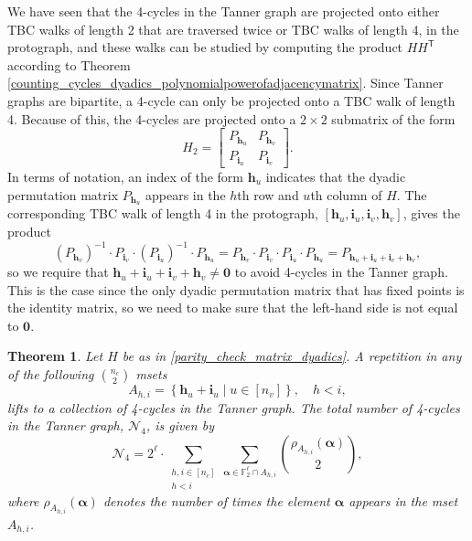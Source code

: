 \documentclass[11pt]{article}
\newtheorem{theorem}[lemma]{Theorem}
\theoremstyle{plain}
\theoremstyle{plain}
\theoremstyle{definition}
\numberwithin{theo}{section}
\newcommand{\bzero}{\mathbf{0}}
\newcommand{\bh}{{\mathbf h}}
\newcommand{\bi}{{\mathbf i}}
\newcommand{\balpha}{{\boldsymbol \alpha}}
\def\matrix#1{\begin{bmatrix}#1\end{bmatrix}} %
\newcounter{alp}
\begin{document}
We have seen that the 4-cycles in the Tanner graph are projected onto either TBC walks of length 2 that are traversed twice or TBC walks of length 4, in the protograph, and these walks can be studied by computing the product $HH^\mathsf{T}$ according to Theorem \ref{counting_cycles_dyadics_polynomialpowerofadjacencymatrix}. Since Tanner graphs are bipartite, a 4-cycle can only be projected onto a TBC walk of length 4. Because of this, the 4-cycles are projected onto a $2\times2$ submatrix of the form
\begin{equation*}
H_2=\matrix{P_{\bh_u}&P_{\bh_v} \\ P_{\bi_u}&P_{\bi_v}}.
\end{equation*}
In terms of notation, an index of the form $\bh_u$ indicates that the dyadic permutation matrix $P_{\bh_u}$ appears in the $h$th row and $u$th column of $H$. The corresponding TBC walk of length 4 in the protograph,
$[\bh_u,\bi_u,\bi_v,\bh_v]$, gives the product
\begin{equation*}
{\left(P_{\bh_v}\right)}^{-1}\cdot P_{\bi_v}\cdot{\left(P_{\bi_u}\right)}^{-1}\cdot P_{\bh_u} = P_{\bh_v}\cdot P_{\bi_v}\cdot P_{\bi_u}\cdot P_{\bh_u} = P_{\bh_u+\bi_u+\bi_v+\bh_v},
\end{equation*}
so we require that 
$\bh_u+\bi_u+\bi_v+\bh_v\neq\bzero$ to avoid 4-cycles in the Tanner graph. This is the case since the only dyadic permutation matrix that has fixed points is the identity matrix, so we need to make sure that the left-hand side is not equal to $\bzero$.  
\begin{theorem}
\label{counting_cycles_thm_4cycles_ncxnv_dyadics}
Let $H$ be as in \eqref{parity_check_matrix_dyadics}. A repetition in any of the following $\binom{n_c}{2}$  
msets
\begin{equation*}
A_{h,i}=\left\{\bh_u+\bi_u\mid u\in[n_v]\right\}, \quad h<i,
\end{equation*}
lifts to a collection of 4-cycles in the Tanner graph. The total number of 4-cycles in the Tanner graph, $\mathcal{N}_4$, is given by
\begin{equation}
\label{counting_cycles_formula_num4cycles_ncxnv_dyadics}
\mathcal{N}_4 = 2^\ell\cdot\sum_{\substack{h,i\in[n_c]\\h<i}}\sum_{\balpha\in\mathbb{F}_2^\ell\cap A_{h,i}}\binom{\rho_{A_{h,i}}(\balpha)}{2},
\end{equation}
where 
$\rho_{A_{h,i}}(\balpha)$ denotes the number of times the element $\balpha$ appears in the mset
$A_{h,i}$.
\end{theorem}
\end{document}

